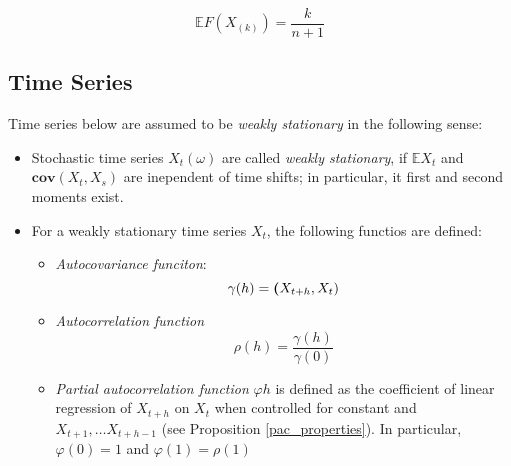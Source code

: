 \documentclass[12pt]{article}
\theoremstyle{definition}
\theoremstyle{remark}
\numberwithin{equation}{section}
\newcommand{\EE}{\mathbb{E}}
\begin{document}
\begin{equation}\label{kth_order_expectation}
	\mathbb{E}F(X_{(k)}) = \frac k{n+1}
\end{equation}

\subsection{Time Series}

Time series below are assumed to be \emph{weakly stationary} in the following sense:

\begin{itemize}
	\item Stochastic time series $X_t(\omega)$ are called \emph{weakly stationary}, if $\EE X_t$ and $\textbf{cov}(X_t, X_s)$ are inependent of time shifts; in particular, it first and second moments exist.
	\item For a weakly stationary time series $X_t$, the following functios are defined:
	\begin{itemize}
		\item\emph{Autocovariance funciton}:
		\begin{equation}
			\gamma(h) = \textbf(X_{t+h}, X_t)
		\end{equation}
		\item \emph{Autocorrelation function}
		\begin{equation}
			\rho(h) = \frac {\gamma(h)}{\gamma(0)}
		\end{equation}
		\item \emph{Partial autocorrelation function} $\varphi{h}$ is defined as the coefficient of linear regression of $X_{t+h}$ on $X_t$ when controlled for constant and $X_{t+1}, \ldots X_{t+h-1}$ (see Proposition \ref{pac_properties}). In particular, $\varphi(0) = 1$ and $\varphi(1) = \rho(1)$
	\end{itemize}

\end{itemize}
\end{document}
